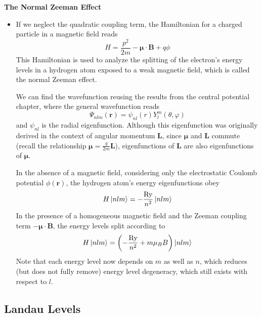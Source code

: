 \documentclass[11pt, a4paper]{article}
\newcommand{\Ham}{Hamiltonian\xspace}
\renewcommand{\vec}[1]{\bm{#1}}  %
\renewcommand{\r}{\vec{r}}  %
\renewcommand{\L}{\vec{L}}  %
\newcommand{\B}{\vec{B}}  %
\newcommand{\m}{\vec{\mu}}  %
\newcommand{\p}{\psi}  %
\renewcommand{\P}{\Psi}  %
\begin{document}
\textbf{The Normal Zeeman Effect}
\begin{itemize}
	\item If we neglect the quadratic coupling term, the Hamiltonian for a charged particle  in a magnetic field reads
	\begin{equation*}
		H = \frac{p^{2}}{2m} - \m \cdot \B + q \phi
	\end{equation*}
	This \Ham is used to analyze the splitting of the electron's energy levels in a hydrogen atom exposed to a weak magnetic field, which is called the normal Zeeman effect. 
	
	We can find the wavefunction reusing the results from the central potential chapter, where the general wavefunction reads
	\begin{equation*}
		\P_{nlm}(\r) = \p_{nl}(r) Y_{l}^{m}(\theta, \varphi)
	\end{equation*}
	and $ \p_{nl} $ is the radial eigenfunction. Although this eigenfunction was originally derived in the context of angular momentum $ \vec{L} $, since $ \m $ and $ \L $ commute (recall the relationship $ \m = \frac{q}{2m}\L $), eigenfunctions of $ \L $ are also eigenfunctions of $ \m $. 
	
    In the absence of a magnetic field, considering only the electrostatic Coulomb potential $ \phi(\r) $, the hydrogen atom's energy eigenfunctions obey
	\begin{equation*}
		H \ket{nlm} = - \frac{\si{Ry}}{n^{2}}\ket{nlm}
	\end{equation*}
	In the presence of a homogeneous magnetic field and the Zeeman coupling term $ - \m \cdot \B $, the energy levels split according to
	\begin{equation*}
		H \ket{nlm} = \left(- \frac{\si{Ry}}{n^{2}} + m \mu_{B}B\right)\ket{nlm}
	\end{equation*}
    Note that each energy level now depends on $ m $ as well as $ n $, which reduces (but does not fully remove) energy level degeneracy, which still exists with respect to $ l $. 
	
\end{itemize}

\subsection{Landau Levels}
\end{document}
